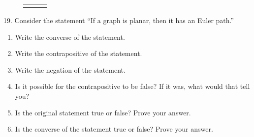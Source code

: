 \documentclass[10pt,]{book}
\theoremstyle{plain}
\theoremstyle{definition}
\theoremstyle{definition}
\theoremstyle{definition}
\numberwithin{equation}{chapter}
\newlength{\panelmax}
\begin{document}
\begin{exerciselist}
{%
\setlength{\tabcolsep}{0\textwidth}
\begin{figure}
\begin{tabular}{@{}*{3}{c}@{}}
\begin{minipage}[c][\panelmax][t]{0.333333333333333\textwidth}\usebox{\panelboxDWimage}\end{minipage}&
\begin{minipage}[c][\panelmax][t]{0.333333333333333\textwidth}\usebox{\panelboxDXimage}\end{minipage}&
\begin{minipage}[c][\panelmax][t]{0.333333333333333\textwidth}\usebox{\panelboxDYimage}\end{minipage}\end{tabular}
\end{figure}
}%


\par\smallskip
\item[19.]\hypertarget{exercise-312}{}
            Consider the statement ``If a graph is planar, then it has an Euler path.''
\leavevmode%
\begin{enumerate}[label=(\alph*)]
\item\hypertarget{li-1283}{}
                Write the converse of the statement.
\item\hypertarget{li-1284}{}
                Write the contrapositive of the statement.
\item\hypertarget{li-1285}{}
                Write the negation of the statement.
\item\hypertarget{li-1286}{}
                Is it possible for the contrapositive to be false? If it was, what would that tell you?
\item\hypertarget{li-1287}{}
                Is the original statement true or false? Prove your answer.
\item\hypertarget{li-1288}{}
                Is the converse of the statement true or false? Prove your answer.
\end{enumerate}
\par\smallskip
\end{exerciselist}
\typeout{************************************************}
\typeout{************************************************}
\end{document}
